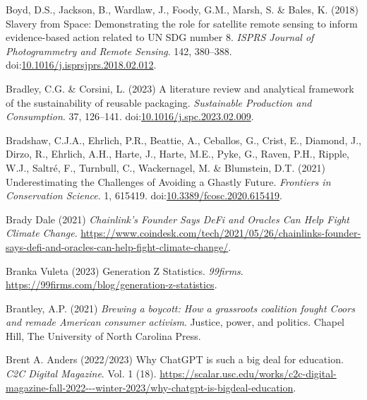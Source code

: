 \documentclass[
  letterpaper,
  DIV=11,
  numbers=noendperiod]{scrartcl}
\newlength{\cslhangindent}
\newenvironment{CSLReferences}[2] %
 {\begin{list}{}{%
  \setlength{\itemindent}{0pt}
  \setlength{\leftmargin}{0pt}
  \setlength{\parsep}{0pt}
  \ifodd #1
   \setlength{\leftmargin}{\cslhangindent}
   \setlength{\itemindent}{-1\cslhangindent}
  \fi
  \setlength{\itemsep}{#2\baselineskip}}}
 {\end{list}}
\begin{document}
\begin{CSLReferences}{0}{1}
Boyd, D.S., Jackson, B., Wardlaw, J., Foody, G.M., Marsh, S. \& Bales,
K. (2018) Slavery from {Space}: {Demonstrating} the role for satellite
remote sensing to inform evidence-based action related to {UN SDG}
number 8. \emph{ISPRS Journal of Photogrammetry and Remote Sensing}.
142, 380--388.
doi:\href{https://doi.org/10.1016/j.isprsjprs.2018.02.012}{10.1016/j.isprsjprs.2018.02.012}.

Bradley, C.G. \& Corsini, L. (2023) A literature review and analytical
framework of the sustainability of reusable packaging. \emph{Sustainable
Production and Consumption}. 37, 126--141.
doi:\href{https://doi.org/10.1016/j.spc.2023.02.009}{10.1016/j.spc.2023.02.009}.

Bradshaw, C.J.A., Ehrlich, P.R., Beattie, A., Ceballos, G., Crist, E.,
Diamond, J., Dirzo, R., Ehrlich, A.H., Harte, J., Harte, M.E., Pyke, G.,
Raven, P.H., Ripple, W.J., Saltré, F., Turnbull, C., Wackernagel, M. \&
Blumstein, D.T. (2021) Underestimating the {Challenges} of {Avoiding} a
{Ghastly Future}. \emph{Frontiers in Conservation Science}. 1, 615419.
doi:\href{https://doi.org/10.3389/fcosc.2020.615419}{10.3389/fcosc.2020.615419}.

Brady Dale (2021) \emph{Chainlink's {Founder Says DeFi} and {Oracles Can
Help Fight Climate Change}}.
\url{https://www.coindesk.com/tech/2021/05/26/chainlinks-founder-says-defi-and-oracles-can-help-fight-climate-change/}.

Branka Vuleta (2023) Generation {Z Statistics}. \emph{99firms}.
\url{https://99firms.com/blog/generation-z-statistics}.

Brantley, A.P. (2021) \emph{Brewing a boycott: How a grassroots
coalition fought {Coors} and remade {American} consumer activism}.
Justice, power, and politics. Chapel Hill, The University of North
Carolina Press.

Brent A. Anders (2022/2023) Why {ChatGPT} is such a big deal for
education. \emph{C2C Digital Magazine}. Vol. 1 (18).
\url{https://scalar.usc.edu/works/c2c-digital-magazine-fall-2022---winter-2023/why-chatgpt-is-bigdeal-education}.


\end{CSLReferences}
\end{document}
